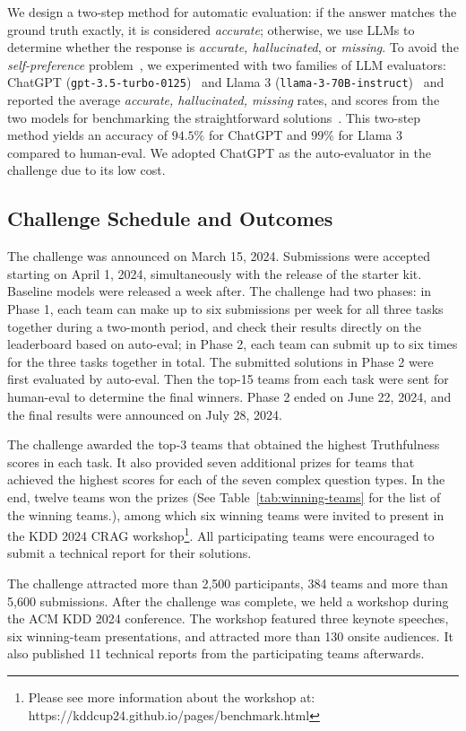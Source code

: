 We design a two-step method for automatic evaluation: if the answer matches the ground truth exactly, it is considered {\em accurate}; otherwise, we use LLMs to determine whether the response is {\em accurate, hallucinated}, or {\em missing}. To avoid the {\em self-preference} problem~\cite{panickssery2024llm}, we experimented with two families of LLM evaluators: ChatGPT (\texttt{gpt-3.5-turbo-0125})~\cite{chatgpt2023} and Llama 3 (\texttt{llama-3-70B-instruct})~\cite{llama3modelcard} and reported the average {\em accurate, hallucinated, missing} rates, and scores from the two models for benchmarking the straightforward solutions~\cite{yang2024crag}. This two-step method yields an accuracy of $94.5\%$ for ChatGPT and $99\%$ for Llama 3 compared to human-eval.  We adopted ChatGPT as the auto-evaluator in the challenge due to its low cost.

\subsection{Challenge Schedule and Outcomes}
The challenge was announced on March 15, 2024. Submissions were accepted starting on April 1, 2024, simultaneously with the release of the starter kit. Baseline models were released a week after. The challenge had two phases: in Phase 1, each team can make up to six submissions per week for all three tasks together during a two-month period, and check their results directly on the leaderboard based on auto-eval; in Phase 2, each team can submit up to six times for the three tasks together in total. The submitted solutions in Phase 2 were first evaluated by auto-eval. Then the top-15 teams from each task were sent for human-eval to determine the final winners. Phase 2 ended on June 22, 2024, and the final results were announced on July 28, 2024. 

The challenge awarded the top-3 teams that obtained the highest Truthfulness scores in each task. It also provided seven additional prizes for teams that achieved the highest scores for each of the seven complex question types. In the end, twelve teams won the prizes (See Table~\ref{tab:winning-teams} for the list of the winning teams.), among which six winning teams were invited to present in the KDD 2024 CRAG workshop\footnote{Please see more information about the workshop at: https://kddcup24.github.io/pages/benchmark.html}. All participating teams were encouraged to submit a technical report for their solutions.

The challenge attracted more than 2,500 participants, 384 teams and more than 5,600 submissions. After the challenge was complete, we held a workshop during the ACM KDD 2024 conference. The workshop featured three keynote speeches, six winning-team presentations, and attracted more than 130 onsite audiences. It also published 11 technical reports from the participating teams afterwards.


